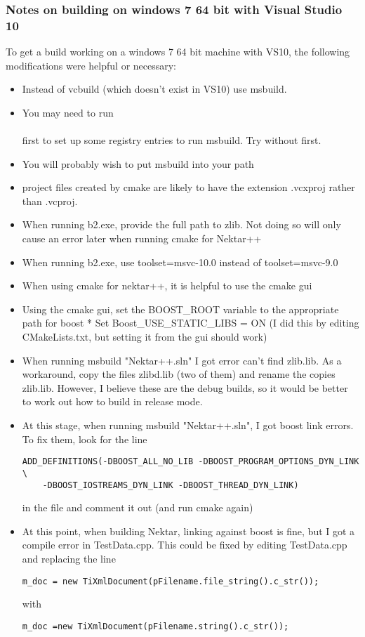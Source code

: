 \subsubsection{Notes on building on windows 7 64 bit with Visual Studio 10}
To get a build working on a windows 7 64 bit machine with VS10, the following
modifications were helpful or necessary:
\begin{itemize}
\item Instead of vcbuild (which doesn't exist in VS10) use msbuild. 
\item You may need to run \\  \\ first to set up some registry entries to run
msbuild.
 Try without first.
\item You will probably wish to put msbuild into your path
\item project files created by cmake are likely to have the extension .vcxproj
 rather than .vcproj.
\item When running b2.exe, provide the full path to zlib. Not doing so will only
 cause an error later when running cmake for Nektar++ 
\item When running b2.exe, use toolset=msvc-10.0 instead of toolset=msvc-9.0
\item When using cmake for nektar++, it is helpful to use the cmake gui
\item Using the cmake gui, set the BOOST\_ROOT variable to the appropriate path
for boost * Set Boost\_USE\_STATIC\_LIBS = ON (I did this by editing
CMakeLists.txt, but setting it from the gui should work)
\item When running msbuild "Nektar++.sln" I got error can't find zlib.lib. As a
 workaround, copy the files zlibd.lib (two of them) and rename the copies zlib.lib. 
 However, I believe these are the debug builds, so it would be better to work 
 out how to build in release mode.
\item At this stage, when running msbuild "Nektar++.sln", I got boost link
errors.
 To fix them, look for the line
\begin{lstlisting}[style=BashInputStyle]
ADD_DEFINITIONS(-DBOOST_ALL_NO_LIB -DBOOST_PROGRAM_OPTIONS_DYN_LINK \
    -DBOOST_IOSTREAMS_DYN_LINK -DBOOST_THREAD_DYN_LINK)
\end{lstlisting}
in the  file and comment it out (and run cmake again) 
\item At this point, when building Nektar, linking against boost is fine, but I
got a compile error in TestData.cpp. This could be fixed by editing TestData.cpp
and replacing the line 
\begin{lstlisting}
m_doc = new TiXmlDocument(pFilename.file_string().c_str());
\end{lstlisting}
with
\begin{lstlisting}
m_doc =new TiXmlDocument(pFilename.string().c_str());
\end{lstlisting}
\end{itemize}

